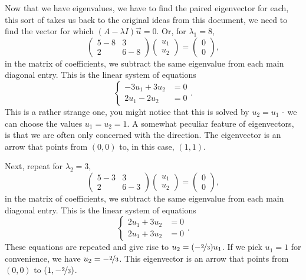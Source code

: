 \documentclass{article}
\begin{document}
Now that we have eigenvalues, we have to find the paired eigenvector for each, this sort of takes us back to the original ideas from this document, we need to find the vector for which \((A-\lambda I)\vec{u} = 0\).  Or, for \(\lambda_1 = 8\), \[\begin{pmatrix} 5-8 & 3 \\ 2 & 6 - 8\end{pmatrix}\begin{pmatrix}u_1\\u_2\end{pmatrix} = \begin{pmatrix}0\\0\end{pmatrix},\] in the matrix of coefficients, we subtract the same eigenvalue from each main diagonal entry. This is the linear system of equations \[\begin{cases}-3u_1 + 3u_2 &=0 \\2u_1 - 2u_2 & =0\end{cases}.\] This is a rather strange one, you might notice that this is solved by \(u_2 = u_1\) - we can choose the values \(u_1 = u_2 = 1\).  A somewhat peculiar feature of eigenvectors, is that we are often only concerned with the direction.  The eigenvector is an arrow that points from \((0, 0)\) to, in this case, \((1, 1)\).

Next, repeat for \(\lambda_2 = 3\), \[\begin{pmatrix} 5-3 & 3 \\ 2 & 6 - 3\end{pmatrix}\begin{pmatrix}u_1\\u_2\end{pmatrix} = \begin{pmatrix}0\\0\end{pmatrix},\] in the matrix of coefficients, we subtract the same eigenvalue from each main diagonal entry. This is the linear system of equations \[\begin{cases}2u_1 + 3u_2 &=0 \\2u_1 + 3u_2 & =0\end{cases}.\] These equations are repeated and give rise to \(u_2 = (-\nicefrac{2}{3})u_1\).  If we pick \(u_1 = 1\) for convenience, we have \(u_2 = -\nicefrac{2}{3}\).  This eigenvector is an arrow that points from \((0, 0)\) to \((1, -\nicefrac{2}{3})\).
\end{document}

